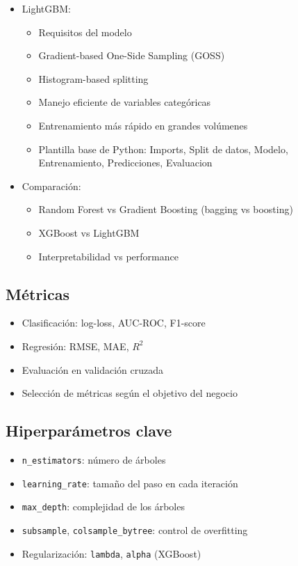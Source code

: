 \documentclass[12pt,a4paper,openany,oneside]{book}
\begin{document}
\begin{itemize}
\begin{itemize}
    \item LightGBM:
    \begin{itemize}
        \item Requisitos del modelo
        \item Gradient-based One-Side Sampling (GOSS)
        \item Histogram-based splitting
        \item Manejo eficiente de variables categóricas
        \item Entrenamiento más rápido en grandes volúmenes
        \item Plantilla base de Python: Imports, Split de datos, Modelo, Entrenamiento, Predicciones, Evaluacion
    \end{itemize}

    \item Comparación:
    \begin{itemize}
        \item Random Forest vs Gradient Boosting (bagging vs boosting)
        \item XGBoost vs LightGBM
        \item Interpretabilidad vs performance
    \end{itemize}
\end{itemize}

\subsection{Métricas}
\begin{itemize}
    \item Clasificación: log-loss, AUC-ROC, F1-score
    \item Regresión: RMSE, MAE, $R^2$
    \item Evaluación en validación cruzada
    \item Selección de métricas según el objetivo del negocio
\end{itemize}

\subsection{Hiperparámetros clave}
\begin{itemize}
    \item \texttt{n\_estimators}: número de árboles
    \item \texttt{learning\_rate}: tamaño del paso en cada iteración
    \item \texttt{max\_depth}: complejidad de los árboles
    \item \texttt{subsample}, \texttt{colsample\_bytree}: control de overfitting
    \item Regularización: \texttt{lambda}, \texttt{alpha} (XGBoost)
\end{itemize}


\end{itemize}
\end{document}
